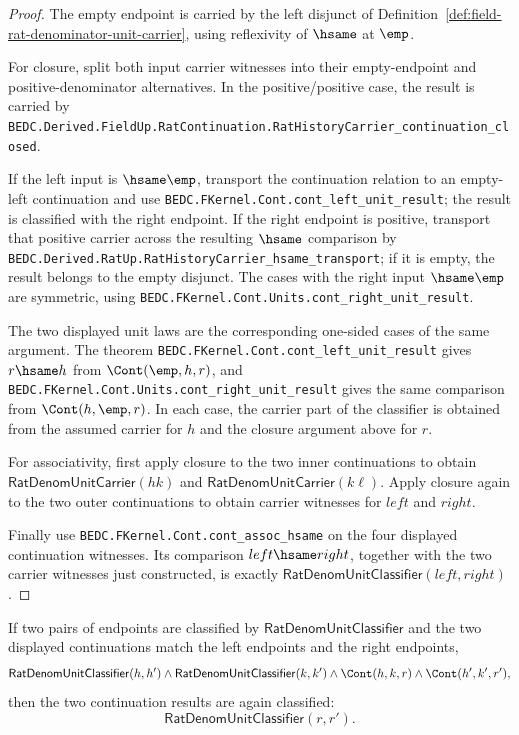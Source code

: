 \begin{proof}
The empty endpoint is carried by the left disjunct of
Definition~\ref{def:field-rat-denominator-unit-carrier}, using reflexivity of
$\hsame$ at $\emp$.

For closure, split both input carrier witnesses into their empty-endpoint and
positive-denominator alternatives. In the positive/positive case, the result is
carried by
\texttt{BEDC.Derived.FieldUp.RatContinuation.RatHistoryCarrier\_continuation\_closed}.

If the left input is $\hsame\emp$, transport the continuation relation to an
empty-left continuation and use
\texttt{BEDC.FKernel.Cont.cont\_left\_unit\_result}; the result is classified
with the right endpoint. If the right endpoint is positive, transport that
positive carrier across the resulting $\hsame$ comparison by
\texttt{BEDC.Derived.RatUp.RatHistoryCarrier\_hsame\_transport}; if it is
empty, the result belongs to the empty disjunct. The cases with the right input
$\hsame\emp$ are symmetric, using
\texttt{BEDC.FKernel.Cont.Units.cont\_right\_unit\_result}.

The two displayed unit laws are the corresponding one-sided cases of the same
argument. The theorem
\texttt{BEDC.FKernel.Cont.cont\_left\_unit\_result} gives $r\hsame h$ from
$\Cont(\emp,h,r)$, and
\texttt{BEDC.FKernel.Cont.Units.cont\_right\_unit\_result} gives the same
comparison from $\Cont(h,\emp,r)$. In each case, the carrier part of the
classifier is obtained from the assumed carrier for $h$ and the closure
argument above for $r$.

For associativity, first apply closure to the two inner continuations to obtain
$\mathsf{RatDenomUnitCarrier}(hk)$ and
$\mathsf{RatDenomUnitCarrier}(k\ell)$. Apply closure again to the two outer
continuations to obtain carrier witnesses for $left$ and $right$.

Finally use \texttt{BEDC.FKernel.Cont.cont\_assoc\_hsame} on the four displayed
continuation witnesses. Its comparison $left\hsame right$, together with the
two carrier witnesses just constructed, is exactly
$\mathsf{RatDenomUnitClassifier}(left,right)$.
\end{proof}

\begin{theorem}
\label{thm:rat-denom-unit-classifier-continuation-closed}
If two pairs of endpoints are classified by
$\mathsf{RatDenomUnitClassifier}$ and the two displayed continuations match
the left endpoints and the right endpoints,
$$
\mathsf{RatDenomUnitClassifier}(h,h')\land
\mathsf{RatDenomUnitClassifier}(k,k')\land
\Cont(h,k,r)\land\Cont(h',k',r'),
$$
then the two continuation results are again classified:
$$
\mathsf{RatDenomUnitClassifier}(r,r').
$$
\end{theorem}


